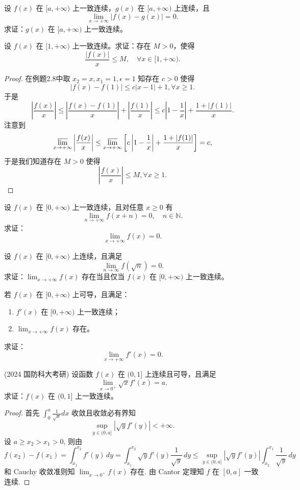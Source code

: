 \documentclass[lang=cn,10pt,thmcnt=section]{elegantbook}
\begin{document}
\begin{example}
	设 \( f(x) \) 在 \([a, +\infty)\) 上一致连续，\( g(x) \) 在 \([a, +\infty)\) 上连续，且
\[ \lim_{x \to +\infty} |f(x) - g(x)| = 0. \]
求证：\( g(x) \) 在 \([a, +\infty)\) 上一致连续。
\end{example}
\begin{example}
	设 \( f(x) \) 在 \([1, +\infty)\) 上一致连续。求证：存在 \( M > 0 \)，使得
\[ \frac{|f(x)|}{x} \leq M, \quad \forall x \in [1, +\infty). \]
\end{example}
\begin{proof}
	在例题2.8中取 $x_2 = x, x_1=1, \epsilon = 1$ 知存在 $c>0$ 使得
\[
|f(x)-f(1)| \le c|x-1|+1, \forall x \ge 1.
\]
于是
\[
\left|\frac{f(x)}{x}\right| \le \left|\frac{f(x)-f(1)}{x}\right| + \left|\frac{f(1)}{x}\right| \le c\left|1-\frac{1}{x}\right| + \frac{1+|f(1)|}{x}.
\]
注意到
\[
\varlimsup_{x \to +\infty} \left|\frac{f(x)}{x}\right| \le \varlimsup_{x \to +\infty} \left[ c\left|1-\frac{1}{x}\right| + \frac{1+|f(1)|}{x} \right] = c,
\]
于是我们知道存在 $M>0$ 使得
\[
\left|\frac{f(x)}{x}\right| \le M, \forall x \ge 1.
\]
\end{proof}
\begin{example}
	设 \( f(x) \) 在 \([0, +\infty)\) 上一致连续，且对任意 \( x \geq 0 \) 有
\[ \lim_{n \to +\infty} f(x+n) = 0, \quad n \in \mathbb{N}. \]
求证：
\[ \lim_{x \to +\infty} f(x) = 0. \]
\end{example}
\begin{example}
	设 \( f(x) \) 在 \([0, +\infty)\) 上连续，且满足
\[ \lim_{n \to \infty} f(\sqrt{n}) = 0. \]
求证：\(\lim_{x \to +\infty} f(x)\) 存在当且仅当 \( f(x) \) 在 \([0, +\infty)\) 上一致连续。

\end{example}
\begin{example}
	若 \( f(x) \) 在 \([0,+\infty)\) 上可导，且满足：
\begin{enumerate}
    \item \( f'(x) \) 在 \([0,+\infty)\) 上一致连续；
    \item \( \lim_{x \to +\infty} f(x) \) 存在。
\end{enumerate}
求证：
\[ \lim_{x \to +\infty} f'(x) = 0. \]
\end{example}
\begin{example}
	(2024 国防科大考研) 设函数 \( f(x) \) 在 \( (0,1] \) 上连续且可导，且满足
    \[ \lim_{x \to 0^+} \sqrt{x}f'(x) = a. \]
    求证：\( f(x) \) 在 \( (0,1] \) 上一致连续。
\end{example}
\begin{proof}
	首先 $\int_0^a \frac{1}{\sqrt{x}}dx$ 收敛且收敛必有界知
\[
\sup_{y \in (0, a]} |\sqrt{y}f'(y)| < +\infty.
\]
设 $a \ge x_2 > x_1 > 0$, 则由
\[
f(x_2) - f(x_1) = \int_{x_1}^{x_2} f'(y) \, dy = \int_{x_1}^{x_2} \sqrt{y}f'(y) \frac{1}{\sqrt{y}} \, dy \le \sup_{y \in (0, a]} |\sqrt{y}f'(y)| \int_{x_2}^{x_1} \frac{1}{\sqrt{y}} \, dy
\]
和 Cauchy 收敛准则知 $\lim_{x \to 0^+} f(x)$ 存在. 由 Cantor 定理知 $f$ 在 $[0, a]$ 一致连续.

\end{proof}
\end{document}
